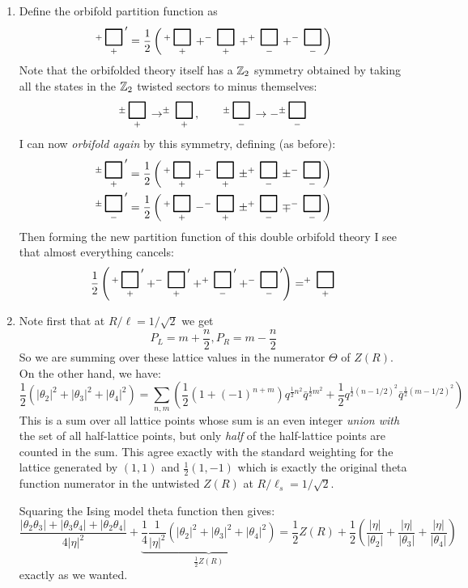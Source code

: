 \documentclass[11pt]{article}
\begin{document}
\begin{enumerate}
	\item Define the orbifold partition function as
	\[
		^+\underset{+}{\BoxPlz}' = \frac12 \left( \,^+\underset{+}{\BoxPlz} + ^-\underset{+}{\BoxPlz} + ^+\underset{-}{\BoxPlz} + ^-\underset{-}{\BoxPlz} \right)
	\]
	Note that the orbifolded theory itself has a $\mathbb{Z}_2$ symmetry obtained by taking all the states in the $\mathbb{Z}_2$ twisted sectors to minus themselves:
	\[
		^\pm\underset{+}{\BoxPlz} \to ^\pm\underset{+}{\BoxPlz}, \qquad ^\pm\underset{-}{\BoxPlz} \to - ^\pm\underset{-}{\BoxPlz}
	\]
	I can now \emph{orbifold again} by this symmetry, defining (as before):
	\[
	\begin{aligned}
		&^\pm\underset{+}{\BoxPlz}' = \frac12 \left( \,^+\underset{+}{\BoxPlz} + ^-\underset{+}{\BoxPlz} \pm ^+\underset{-}{\BoxPlz} \pm ^-\underset{-}{\BoxPlz} \right)\\
		& ^\pm\underset{-}{\BoxPlz}' = \frac12 \left( \,^+\underset{+}{\BoxPlz} - ^-\underset{+}{\BoxPlz} \pm ^+\underset{-}{\BoxPlz} \mp ^-\underset{-}{\BoxPlz} \right)
	\end{aligned}
	\]
	Then forming the new partition function of this double orbifold theory I see that almost everything cancels:
	\[
		\frac12 \left( \,^+\underset{+}{\BoxPlz}' + ^-\underset{+}{\BoxPlz}' + ^+\underset{-}{\BoxPlz}' + ^-\underset{-}{\BoxPlz}' \right) = ^+\underset{+}{\BoxPlz}
	\]
	\item Note first that at $R/\ell = 1/\sqrt{2}$ we get \[
		P_L = m + \frac{n}{2}, P_R = m - \frac{n}{2}
	\]
	So we are summing over these lattice values in the numerator $\Theta$ of $Z(R)$. On the other hand, we have:
	\[
		\frac12(|\theta_2|^2 + |\theta_3|^2 + |\theta_4|^2) = \sum_{n, m} \left( \frac12 (1 + (-1)^{n+m}) q^{\frac12 n^2} \bar q^{\frac12 m^2} + \frac12 q^{\frac12 (n-1/2)^2} \bar q^{\frac12 (m-1/2)^2}  \right)
	\]
	This is a sum over all lattice points whose sum is an even integer \emph{union with} the set of all half-lattice points, but only \emph{half} of the half-lattice points are counted in the sum. This agree exactly with the standard weighting for the lattice generated by $(1, 1)$ and $\frac12 (1, -1)$ which is exactly the original theta function numerator in the untwisted $Z(R)$ at $R/\ell_s = 1/\sqrt{2}$. 
	
	Squaring the Ising model theta function then gives:
	\[
		\frac{|\theta_2 \theta_3| + |\theta_3 \theta_4| + |\theta_2 \theta_4|}{4|\eta|^2} + \underbrace{\frac14 \frac{1}{|\eta|^2}(|\theta_2|^2 + |\theta_3|^2 + |\theta_4|^2)}_{\frac12 Z(R)} = \frac12 Z(R) + \frac12 \left(\frac{|\eta|}{|\theta_2|} + \frac{|\eta|}{|\theta_3|} + \frac{|\eta|}{|\theta_4|} \right)
	\]
	exactly as we wanted. 
	


\end{enumerate}
\end{document}
